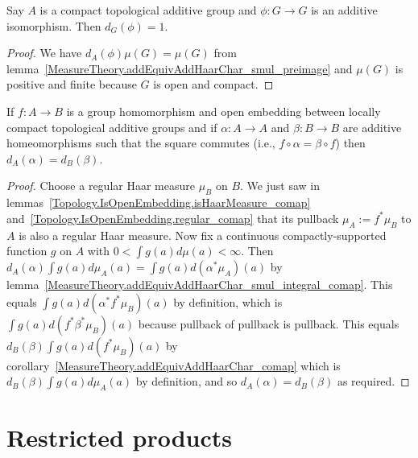 \begin{lemma}
  \label{MeasureTheory.mulEquivHaarChar_eq_one_of_compactSpace}
  \leanok
  Say $A$ is a compact topological additive group and $\phi:G\to G$ is an additive isomorphism.
Then $d_G(\phi)=1.$
\end{lemma}
\begin{proof}
  We have $d_A(\phi)\mu(G)=\mu(G)$
  from lemma~\ref{MeasureTheory.addEquivAddHaarChar_smul_preimage}
  and $\mu(G)$ is positive and finite because $G$ is open and compact.
\end{proof}

\begin{lemma}
  \label{MeasureTheory.addEquivAddHaarChar_eq_addEquivAddHaarChar_of_isOpenEmbedding}
  \leanok
  If $f:A\to B$ is a group homomorphism and open embedding between locally compact
  topological additive groups and if $\alpha:A\to A$ and $\beta:B\to B$ are additive
  homeomorphisms such that the square commutes (i.e., $f\circ\alpha=\beta\circ f$)
  then $d_A(\alpha)=d_B(\beta)$.
\end{lemma}
\begin{proof}
  \leanok
  Choose a regular Haar measure $\mu_B$ on $B$. We just saw
  in lemmas~\ref{Topology.IsOpenEmbedding.isHaarMeasure_comap}
  and~\ref{Topology.IsOpenEmbedding.regular_comap} that its pullback
  $\mu_A:=f^*\mu_B$ to $A$ is also a regular Haar
  measure. Now fix a continuous compactly-supported function $g$ on $A$ with
  $0<\int g(a)d\mu(a)<\infty$. Then $d_A(\alpha)\int g(a)d\mu_A(a)=\int g(a)d(\alpha^*\mu_A)(a)$
  by lemma~\ref{MeasureTheory.addEquivAddHaarChar_smul_integral_comap}.
  This equals $\int g(a)d(\alpha^* f^*\mu_B)(a)$ by definition,
  which is $\int g(a)d(f^*\beta^*\mu_B)(a)$ because pullback of pullback is pullback.
  This equals $d_B(\beta)\int g(a) d(f^*\mu_B)(a)$ by
  corollary~\ref{MeasureTheory.addEquivAddHaarChar_comap}
  which is $d_B(\beta)\int g(a)d\mu_A(a)$ by definition,
  and so $d_A(\alpha)=d_B(\beta)$ as required.
\end{proof}

\section{Restricted products}

